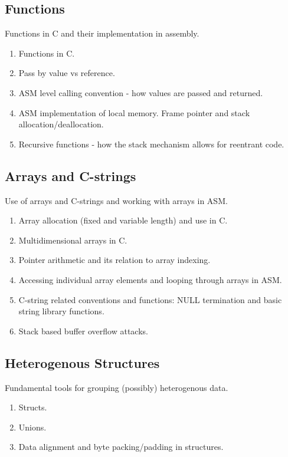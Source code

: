 \documentclass[12pt,letterpaper]{article}
\begin{document}
	\subsection{Functions}

	Functions in C and their implementation in assembly.

	\begin{enumerate}
		\item Functions in C.
		\item Pass by value vs reference.
		\item ASM level calling convention - how values are passed and returned.
		\item ASM implementation of local memory. Frame pointer and stack allocation/deallocation.
		\item Recursive functions - how the stack mechanism allows for reentrant code. 
	\end{enumerate}


	\subsection{Arrays and C-strings}

	Use of arrays and C-strings and working with arrays in ASM.

	\begin{enumerate}
		\item Array allocation (fixed and variable length) and use in C. 
		\item Multidimensional arrays in C.
		\item Pointer arithmetic and its relation to array indexing.
		\item Accessing individual array elements and looping through arrays in ASM.
		\item C-string related conventions and functions: NULL termination and basic string library functions.
		\item Stack based buffer overflow attacks.
	\end{enumerate}

	\subsection{Heterogenous Structures}

	Fundamental tools for grouping (possibly) heterogenous data.

	\begin{enumerate}
		\item Structs.
		\item Unions.
		\item Data alignment and byte packing/padding in structures. 
	\end{enumerate}
\end{document}
